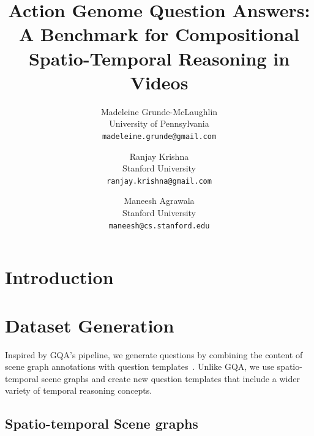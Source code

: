 \documentclass[10pt,twocolumn,letterpaper]{article}
\begin{document}
\title{Action Genome Question Answers: \\ A Benchmark for Compositional Spatio-Temporal Reasoning in Videos}

\author{Madeleine Grunde-McLaughlin\\
University of Pennsylvania\\
{\tt\small madeleine.grunde@gmail.com}

\and
Ranjay Krishna\\
Stanford University\\
{\tt\small ranjay.krishna@gmail.com}

\and
Maneesh Agrawala\\
Stanford University\\
{\tt\small maneesh@cs.stanford.edu}


}
\maketitle
\pagestyle{empty}

\begin{abstract}

\end{abstract}


\section{Introduction}



\section{Dataset Generation}

Inspired by GQA's pipeline, we generate questions by combining the content of scene graph annotations with question templates~\cite{hudson2019gqa}. Unlike GQA, we use spatio-temporal scene graphs and create new question templates that include a wider variety of temporal reasoning concepts. 

\subsection{Spatio-temporal Scene graphs}
\end{document}
